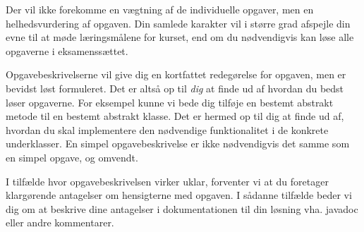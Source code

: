 
Der vil ikke forekomme en vægtning af de individuelle opgaver, men en
helhedsvurdering af opgaven. Din samlede karakter vil i større grad
afspejle din evne til at møde læringsmålene for kurset\footnotemark,
end om du nødvendigvis kan løse alle opgaverne i eksamenssættet.



Opgavebeskrivelserne vil give dig en kortfattet redegørelse for
opgaven, men er bevidst løst formuleret. Det er altså op til
\emph{dig} at finde ud af hvordan du bedst løser opgaverne. For
eksempel kunne vi bede dig tilføje en bestemt abstrakt metode til en
bestemt abstrakt klasse. Det er hermed op til dig at finde ud af,
hvordan du skal implementere den nødvendige funktionalitet i de
konkrete underklasser. En simpel opgavebeskrivelse er ikke nødvendigvis
det samme som en simpel opgave, og omvendt.


I tilfælde hvor opgavebeskrivelsen virker uklar, forventer vi at du
foretager klargørende antagelser om hensigterne med opgaven. I sådanne
tilfælde beder vi dig om at beskrive dine antagelser i dokumentationen
til din løsning vha. javadoc eller andre kommentarer.



